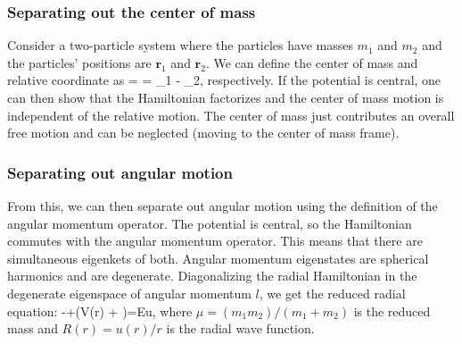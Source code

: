 \subsubsection{Separating out the center of mass}
Consider a two-particle system where the particles have masses $m_1$ and $m_2$ and the particles' positions are $\bm{r}_1$ and $\bm{r}_2$. We can define the center of mass and relative coordinate as
\bea
	 = \quad {} = _1 - _2,
\eea
respectively. If the potential is central, one can then show that the Hamiltonian factorizes and the center of mass motion is independent of the relative motion. The center of mass just contributes an overall free motion and can be neglected (moving to the center of mass frame).

\subsubsection{Separating out angular motion}
From this, we can then separate out angular motion using the definition of the angular momentum operator. The potential is central, so the Hamiltonian commutes with the angular momentum operator. This means that there are simultaneous eigenkets of both. Angular momentum eigenstates are spherical harmonics and are degenerate. Diagonalizing the radial Hamiltonian in the degenerate eigenspace of angular momentum $l$, we get the reduced radial equation:
\be
	-+\left(V(r) + \right)=Eu,
\ee
where $\mu=(m_1m_2)/(m_1+m_2)$ is the reduced mass and $R(r) = u(r)/r$ is the radial wave function.


